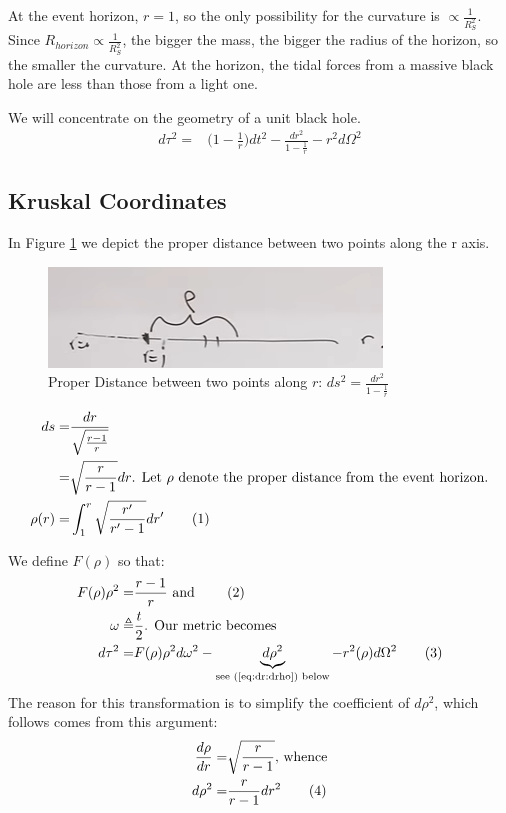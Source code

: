 \documentclass[]{article}
\newcommand\numberthis{\addtocounter{equation}{1}\tag{\theequation}}
\begin{document}
{At the event horizon, $r=1$, so the only possibility for the curvature is $\propto \frac{1}{R_S^2}$. Since $R_{horizon} \propto \frac{1}{R_S^2}$, the bigger the mass, the bigger the radius of the horizon, so the smaller the curvature. At the horizon, the tidal forces from a massive black hole are less than those from a light one.

We will concentrate on the geometry of a unit black hole.
\begin{align*}
	d\tau^2 =& \big(1-\frac{1}{r}\big)d t^2 - \frac{d r^2 }{1-\frac{1}{r}} - r^2 d\Omega^2
\end{align*}

\subsection{Kruskal Coordinates}\label{sec:kruskal:coordinates}

In Figure \ref{fig:gr-7-proper-distance} we depict the proper distance between two points along the r axis.
\begin{figure}[H]
	\caption{Proper Distance between two points along $r$: $ds^2 = \frac{dr^2}{1-\frac{1}{r}}$}\label{fig:gr-7-proper-distance}
	\includegraphics{gr-7-proper-distance}
\end{figure}

\begin{align*}
	ds =& \frac{dr}{\sqrt{\frac{r-1}{r}}}\\
	=& \sqrt{\frac{r}{r-1}} dr \text{. Let $\rho$ denote the proper distance from the event horizon.} \\
	\rho(r) =& \int_{1}^{r}\sqrt{\frac{r^\prime}{r^\prime-1}} dr^\prime  \numberthis \label{eq:rho_r}
\end{align*}

We define $	F(\rho)$ so that:
\begin{align*}
	F(\rho) \rho^2 = &\frac{r-1}{r} \text{ and } \numberthis \label{eq:def:F}\\
	\omega \triangleq & \frac{t}{2} \text{. Our metric becomes }\\
	d\tau^2 =& F(\rho) \rho^2 d\omega^2 - \underbrace{d\rho^2}_\text{see (\ref{eq:dr:drho}) below} -r^2(\rho) d\Omega^2 \numberthis \label{eq:tau:rho:omega}
\end{align*}
The reason for this transformation is to simplify the coefficient of $d\rho^2$, which follows comes from this argument:
\begin{align*}
	\frac{d\rho}{dr}=& \sqrt{\frac{r}{r-1}} \text{, whence} \\
	d\rho^2 =& \frac{r}{r-1}dr^2 \numberthis \label{eq:dr:drho}
\end{align*}

}
\end{document}
